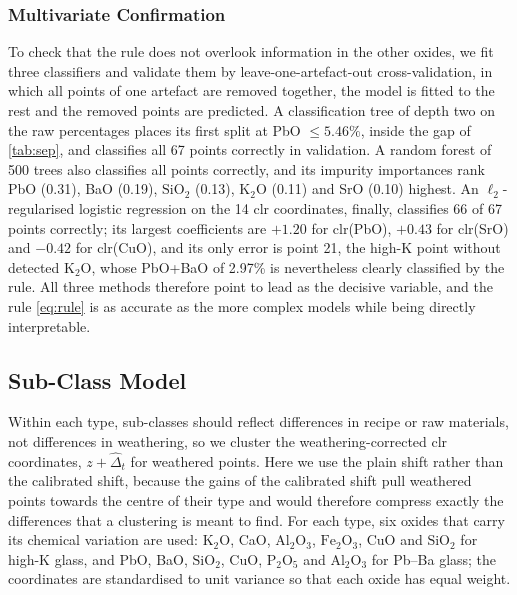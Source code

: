 \documentclass[11pt,a4paper]{article}
\newcommand{\ox}[1]{\ensuremath{\mathrm{#1}}}
\begin{document}
\subsubsection{Multivariate Confirmation}
To check that the rule does not overlook information in the other oxides, we fit three classifiers and validate them by leave-one-artefact-out cross-validation, in which all points of one artefact are removed together, the model is fitted to the rest and the removed points are predicted.
A classification tree of depth two \citep{breiman1984} on the raw percentages places its first split at PbO $\le 5.46\%$, inside the gap of \cref{tab:sep}, and classifies all 67 points correctly in validation.
A random forest of 500 trees \citep{breiman2001} also classifies all points correctly, and its impurity importances rank PbO (0.31), BaO (0.19), \ox{SiO_2} (0.13), \ox{K_2O} (0.11) and SrO (0.10) highest.
An $\ell_2$-regularised logistic regression on the 14 clr coordinates, finally, classifies 66 of 67 points correctly; its largest coefficients are $+1.20$ for clr(PbO), $+0.43$ for clr(SrO) and $-0.42$ for clr(CuO), and its only error is point 21, the high-K point without detected \ox{K_2O}, whose PbO+BaO of 2.97\% is nevertheless clearly classified by the rule.
All three methods therefore point to lead as the decisive variable, and the rule \cref{eq:rule} is as accurate as the more complex models while being directly interpretable.

\subsection{Sub-Class Model}
Within each type, sub-classes should reflect differences in recipe or raw materials, not differences in weathering, so we cluster the weathering-corrected clr coordinates, $z+\hat\Delta_t$ for weathered points.
Here we use the plain shift rather than the calibrated shift, because the gains of the calibrated shift pull weathered points towards the centre of their type and would therefore compress exactly the differences that a clustering is meant to find.
For each type, six oxides that carry its chemical variation are used: \ox{K_2O}, CaO, \ox{Al_2O_3}, \ox{Fe_2O_3}, CuO and \ox{SiO_2} for high-K glass, and PbO, BaO, \ox{SiO_2}, CuO, \ox{P_2O_5} and \ox{Al_2O_3} for Pb--Ba glass; the coordinates are standardised to unit variance so that each oxide has equal weight.
\end{document}

